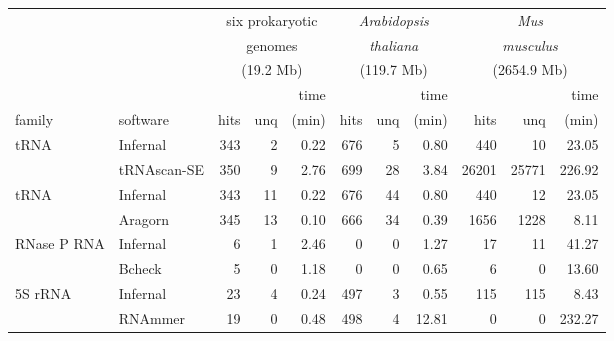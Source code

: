 \begin{small}
\begin{table}
\begin{center}
\begin{tabular}{|l|l|rrr|rrr|rrr|} \cline{3-11}
\multicolumn{1}{c}{}  &  \multicolumn{1}{c|}{}  &  \multicolumn{3}{c|}{six prokaryotic}  &  \multicolumn{3}{c|}{\emph{Arabidopsis}}&  \multicolumn{3}{c|}{\emph{Mus}} \\
\multicolumn{1}{c}{}  &  \multicolumn{1}{c|}{}  &  \multicolumn{3}{c|}{genomes}        &  \multicolumn{3}{c|}{\emph{thaliana}}   &  \multicolumn{3}{c|}{\emph{musculus}}   \\ 
\multicolumn{1}{c}{}  &  \multicolumn{1}{c|}{}  &  \multicolumn{3}{c|}{(19.2 Mb)}  &  \multicolumn{3}{c|}{(119.7 Mb)}  &  \multicolumn{3}{c|}{(2654.9 Mb)}   \\ \cline{3-11}
\multicolumn{1}{c}{}  &  \multicolumn{1}{c|}{}  &      &     &    time &       &      &    time &      &     &    time  \\ 
\multicolumn{1}{l}{family} &  \multicolumn{1}{l|}{software}  &  hits & unq &   (min) &  hits & unq &   (min) &  hits & unq &   (min)  \\ \hline 
tRNA                       &  Infernal                   &  343 &   2 &    0.22 &  676 &   5 &    0.80 &  440 &  10 &   23.05  \\ 
                           &  tRNAscan-SE                &  350 &   9 &    2.76 &  699 &  28 &    3.84 &  26201 & 25771 &  226.92  \\ \hline 
tRNA                       &  Infernal                   &  343 &  11 &    0.22 &  676 &  44 &    0.80 &  440 &  12 &   23.05  \\ 
                           &  Aragorn                    &  345 &  13 &    0.10 &  666 &  34 &    0.39 &  1656 & 1228 &    8.11  \\ \hline 
RNase P RNA                &  Infernal                   &    6 &   1 &    2.46 &    0 &   0 &    1.27 &   17 &  11 &   41.27  \\ 
                           &  Bcheck                     &    5 &   0 &    1.18 &    0 &   0 &    0.65 &    6 &   0 &   13.60  \\ \hline 
5S rRNA                    &  Infernal                   &   23 &   4 &    0.24 &  497 &   3 &    0.55 &  115 & 115 &    8.43  \\ 
                           &  RNAmmer                    &   19 &   0 &    0.48 &  498 &   4 &   12.81 &    0 &   0 &  232.27  \\ \hline 

\end{tabular}
\end{center}
\end{table}
\end{small}
